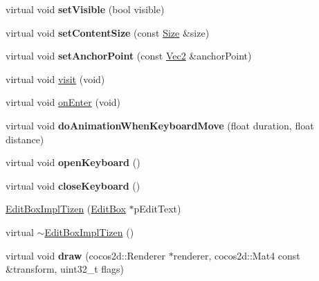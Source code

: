 \begin{DoxyCompactItemize}
\item 
\mbox{\label{classui_1_1EditBoxImplTizen_ae1f9c943698d1884d809c7af01e04bf5}} 
virtual void {\bfseries set\+Visible} (bool visible)
\item 
\mbox{\label{classui_1_1EditBoxImplTizen_a6b2b0334eecc39a1ba60c856637ee7c8}} 
virtual void {\bfseries set\+Content\+Size} (const \hyperlink{classSize}{Size} \&size)
\item 
\mbox{\label{classui_1_1EditBoxImplTizen_a87cc50944d3311dfa8e5f14ca70df7c4}} 
virtual void {\bfseries set\+Anchor\+Point} (const \hyperlink{classVec2}{Vec2} \&anchor\+Point)
\item 
virtual void \hyperlink{classui_1_1EditBoxImplTizen_ae873d765e0f7f369691dca2ef308be41}{visit} (void)
\item 
virtual void \hyperlink{classui_1_1EditBoxImplTizen_a92fc78c9eb060713992b8dc4f61e8f32}{on\+Enter} (void)
\item 
\mbox{\label{classui_1_1EditBoxImplTizen_a9d529391fd9b20865d0915ccc3e051b2}} 
virtual void {\bfseries do\+Animation\+When\+Keyboard\+Move} (float duration, float distance)
\item 
\mbox{\label{classui_1_1EditBoxImplTizen_a7d8e20dfafab18669336df3d36b15cda}} 
virtual void {\bfseries open\+Keyboard} ()
\item 
\mbox{\label{classui_1_1EditBoxImplTizen_a31c337455208e2314ab1de3409c660d4}} 
virtual void {\bfseries close\+Keyboard} ()
\item 
\hyperlink{classui_1_1EditBoxImplTizen_a4ec99ac2f65e3138baf2098c2713b111}{Edit\+Box\+Impl\+Tizen} (\hyperlink{classui_1_1EditBox}{Edit\+Box} $\ast$p\+Edit\+Text)
\item 
virtual \hyperlink{classui_1_1EditBoxImplTizen_ab0b631b46eb0682948cb0bbdea7f33fe}{$\sim$\+Edit\+Box\+Impl\+Tizen} ()
\item 
\mbox{\label{classui_1_1EditBoxImplTizen_a5e212e9858372427d3cdcc1511c5c99d}} 
virtual void {\bfseries draw} (cocos2d\+::\+Renderer $\ast$renderer, cocos2d\+::\+Mat4 const \&transform, uint32\+\_\+t flags)

\end{DoxyCompactItemize}
